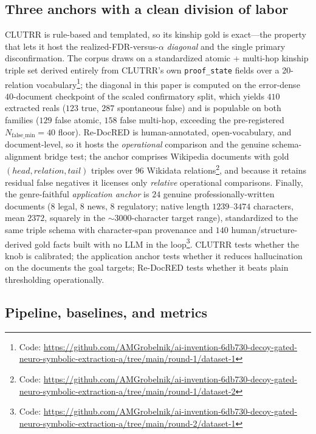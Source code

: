 \documentclass[11pt,letterpaper]{article}
\begin{document}
\subsection{Three anchors with a clean division of labor}

CLUTRR \cite{Sinha2019} is rule-based and templated, so its kinship gold is exact---the property that lets it host the realized-FDR-versus-$\alpha$ \emph{diagonal} and the single primary disconfirmation. The corpus draws on a standardized atomic + multi-hop kinship triple set derived entirely from CLUTRR's own \texttt{proof\_state} fields over a 20-relation vocabulary\footnote{Code: \url{https://github.com/AMGrobelnik/ai-invention-6db730-decoy-gated-neuro-symbolic-extraction-a/tree/main/round-1/dataset-1}}; the diagonal in this paper is computed on the error-dense $40$-document checkpoint of the scaled confirmatory split, which yields $410$ extracted reals ($123$ true, $287$ spontaneous false) and is populable on both families ($129$ false atomic, $158$ false multi-hop, exceeding the pre-registered $N_{\text{false\_min}}=40$ floor). Re-DocRED \cite{Tan2022} is human-annotated, open-vocabulary, and document-level, so it hosts the \emph{operational} comparison and the genuine schema-alignment bridge test; the anchor comprises Wikipedia documents with gold $(head, relation, tail)$ triples over $96$ Wikidata relations\footnote{Code: \url{https://github.com/AMGrobelnik/ai-invention-6db730-decoy-gated-neuro-symbolic-extraction-a/tree/main/round-1/dataset-2}}, and because it retains residual false negatives it licenses only \emph{relative} operational comparisons. Finally, the genre-faithful \emph{application anchor} is $24$ genuine professionally-written documents ($8$ legal, $8$ news, $8$ regulatory; native length $1239$--$3474$ characters, mean $2372$, squarely in the $\sim$3000-character target range), standardized to the same triple schema with character-span provenance and $140$ human/structure-derived gold facts built with no LLM in the loop\footnote{Code: \url{https://github.com/AMGrobelnik/ai-invention-6db730-decoy-gated-neuro-symbolic-extraction-a/tree/main/round-2/dataset-1}}. CLUTRR tests whether the knob is calibrated; the application anchor tests whether it reduces hallucination on the documents the goal targets; Re-DocRED tests whether it beats plain thresholding operationally.

\subsection{Pipeline, baselines, and metrics}
\end{document}

